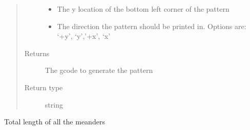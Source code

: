\documentclass[letterpaper,10pt,english]{sphinxmanual}
\begin{document}
\begin{fulllineitems}
\begin{fulllineitems}
\begin{quote}
\begin{description}
\begin{itemize}
\item {} 
\sphinxAtStartPar
{} \textendash{} The y location of the bottom left corner of the pattern

\item {} 
\sphinxAtStartPar
{} \textendash{} The direction the pattern should be printed in. Options are: ‘+y’, ‘\sphinxhyphen{}y’,’+x’, ‘\sphinxhyphen{}x’

\end{itemize}

\item[{Returns}] \leavevmode
\sphinxAtStartPar
The gcode to generate the pattern

\item[{Return type}] \leavevmode
\sphinxAtStartPar
string

\end{description}\end{quote}

\end{fulllineitems}


\begin{fulllineitems}
\label{\detokenize{index:calibration_pattern.calibration_pattern.interlocked_signal_pattern}}
\end{fulllineitems}


\begin{fulllineitems}
\label{\detokenize{index:calibration_pattern.calibration_pattern.length}}
\sphinxAtStartPar
Total length of all the meanders

\end{fulllineitems}



\end{fulllineitems}
\end{document}
